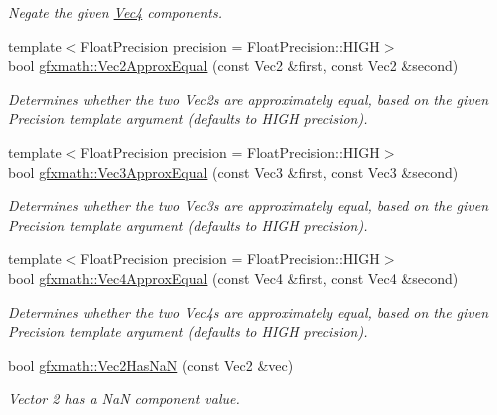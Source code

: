 \begin{DoxyCompactItemize}
\begin{DoxyCompactList}\small\item\em Negate the given \hyperlink{classgfxmath_1_1_vec4}{Vec4} components. \end{DoxyCompactList}\item 
{\footnotesize template$<$Float\+Precision precision = Float\+Precision\+::\+H\+I\+G\+H$>$ }\\bool \hyperlink{group___s_i_s_d_vec_math_gae2e5df24e56917013fefa17579bb8749}{gfxmath\+::\+Vec2\+Approx\+Equal} (const Vec2 \&first, const Vec2 \&second)
\begin{DoxyCompactList}\small\item\em Determines whether the two Vec2s are approximately equal, based on the given Precision template argument (defaults to H\+I\+G\+H precision). \end{DoxyCompactList}\item 
{\footnotesize template$<$Float\+Precision precision = Float\+Precision\+::\+H\+I\+G\+H$>$ }\\bool \hyperlink{group___s_i_s_d_vec_math_gac042c4407bfaa66715e3c4b5b0a839f4}{gfxmath\+::\+Vec3\+Approx\+Equal} (const Vec3 \&first, const Vec3 \&second)
\begin{DoxyCompactList}\small\item\em Determines whether the two Vec3s are approximately equal, based on the given Precision template argument (defaults to H\+I\+G\+H precision). \end{DoxyCompactList}\item 
{\footnotesize template$<$Float\+Precision precision = Float\+Precision\+::\+H\+I\+G\+H$>$ }\\bool \hyperlink{group___s_i_s_d_vec_math_ga819b8c958e12f0838288c641af7e1ab6}{gfxmath\+::\+Vec4\+Approx\+Equal} (const Vec4 \&first, const Vec4 \&second)
\begin{DoxyCompactList}\small\item\em Determines whether the two Vec4s are approximately equal, based on the given Precision template argument (defaults to H\+I\+G\+H precision). \end{DoxyCompactList}\item 
bool \hyperlink{group___s_i_s_d_vec_math_ga7b340b1e4dd88d99aba27f41cd0c1d17}{gfxmath\+::\+Vec2\+Has\+Na\+N} (const Vec2 \&vec)
\begin{DoxyCompactList}\small\item\em Vector 2 has a Na\+N component value. \end{DoxyCompactList}\item 

\end{DoxyCompactItemize}

